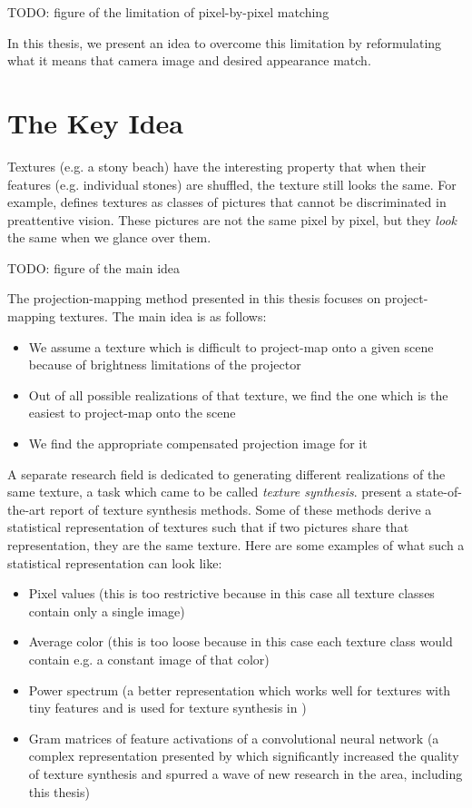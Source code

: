 {\color{red} TODO: figure of the limitation of pixel-by-pixel matching}

In this thesis, we present an idea to overcome this limitation by reformulating what it means that camera image and desired appearance match.

\section{The Key Idea}
\label{section:intro-key_idea}

Textures (e.g. a stony beach) have the interesting property that when their features (e.g. individual stones) are shuffled, the texture still looks the same. For example, \citet*{Julesz1995} defines textures as classes of pictures that cannot be discriminated in preattentive vision. These pictures are not the same pixel by pixel, but they \textit{look} the same when we glance over them.

{\color{red} TODO: figure of the main idea}

The projection-mapping method presented in this thesis focuses on project-mapping textures. The main idea is as follows:

\begin{itemize}
    \item We assume a texture which is difficult to project-map onto a given scene because of brightness limitations of the projector
    \item Out of all possible realizations of that texture, we find the one which is the easiest to project-map onto the scene
    \item We find the appropriate compensated projection image for it
\end{itemize}

A separate research field is dedicated to generating different realizations of the same texture, a task which came to be called \textit{texture synthesis}. \citet*{Raad2018} present a state-of-the-art report of texture synthesis methods. Some of these methods derive a statistical representation of textures such that if two pictures share that representation, they are the same texture. Here are some examples of what such a statistical representation can look like:

\begin{itemize}
    \item Pixel values (this is too restrictive because in this case all texture classes contain only a single image)
    \item Average color (this is too loose because in this case each texture class would contain e.g. a constant image of that color)
    \item Power spectrum (a better representation which works well for textures with tiny features and is used for texture synthesis in \citet*{Galerne2011})
    \item Gram matrices of feature activations of a convolutional neural network (a complex representation presented by \citet*{Gatys2015} which significantly increased the quality of texture synthesis and spurred a wave of new research in the area, including this thesis)
\end{itemize}

